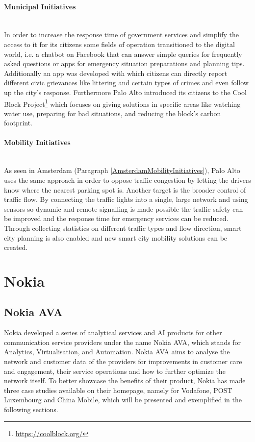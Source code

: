\documentclass[a4paper,12pt]{report}
\begin{document}
		\paragraph{Municipal Initiatives} \hfill \\
		In order to increase the response time of government services and simplify the access to it for its citizens some fields of operation transitioned to the digital world, i.e. a chatbot on Facebook that can answer simple queries for frequently asked questions or apps for emergency situation preparations and planning tips. 
		Additionally an app was developed with which citizens can directly report different civic grievances like littering and certain types of crimes and even follow up the city's response. 
		Furthermore Palo Alto introduced its citizens to the Cool Block Project\footnote{\url{https://coolblock.org/}} which focuses on giving solutions in specific areas like watching water use, preparing for bad situations, and reducing the block's carbon footprint.	
		
		\paragraph{Mobility Initiatives} \hfill \\
		As seen in Amsterdam (Paragraph \ref{AmsterdamMobilityInitiatives}), Palo Alto  uses the same approach in order to oppose traffic congestion by letting the drivers know where the nearest parking spot is. 
		Another target is the broader control of traffic flow. 
		By connecting the traffic lights into a single, large network and using sensors so dynamic and remote signalling is made possible the traffic safety can be improved and the response time for emergency services can be reduced. 
		Through collecting statistics on different traffic types and flow direction, smart city planning is also enabled and new smart city mobility solutions can be created.
	\closesection
	
	\section{Nokia}
	\startsection
		\subsection[Nokia AVA]{Nokia AVA \cite{NokiaAVACrowdAnalytics}}
		\startsubsection
			Nokia developed a series of analytical services and AI products for other communication service providers under the name Nokia AVA, which stands for Analytics, Virtualisation, and Automation. 
			Nokia AVA aims to analyse the network and customer data of the providers for improvements in customer care and engagement, their service operations and how to further optimize the network itself.
			To better showcase the benefits of their product, Nokia has made three case studies available on their homepage, namely for Vodafone, POST Luxembourg and China Mobile, which will be presented and exemplified in the following sections.
			
\end{document}
